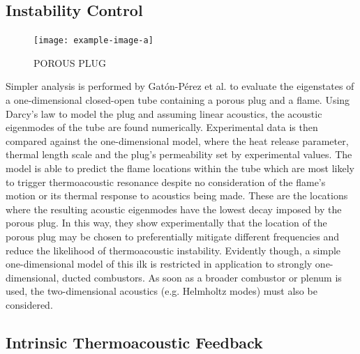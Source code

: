 

\subsection{Instability Control}


\begin{figure}[t]
\centering
\texttt{[image: example-image-a]}
\caption{POROUS PLUG}
\label{fig:porous-plug}
\end{figure}

Simpler analysis is performed by Gatón-Pérez et al. \cite{gaton-perez2025MitigationThermoacousticInstabilities} to evaluate the eigenstates of a one-dimensional closed-open tube containing a porous plug and a flame. Using Darcy's law to model the plug and assuming linear acoustics, the acoustic eigenmodes of the tube are found numerically. Experimental data is then compared against the one-dimensional model, where the heat release parameter, thermal length scale and the plug's permeability set by experimental values. The model is able to predict the flame locations within the tube which are most likely to trigger thermoacoustic resonance despite no consideration of the flame's motion or its thermal response to acoustics being made. These are the locations where the resulting acoustic eigenmodes have the lowest decay imposed by the porous plug. In this way, they show experimentally that the location of the porous plug may be chosen to preferentially mitigate different frequencies and reduce the likelihood of thermoacoustic instability. Evidently though, a simple one-dimensional model of this ilk is restricted in application to strongly one-dimensional, ducted combustors. As soon as a broader combustor or plenum is used, the two-dimensional acoustics (e.g. Helmholtz modes) must also be considered.







\subsection{Intrinsic Thermoacoustic Feedback}

